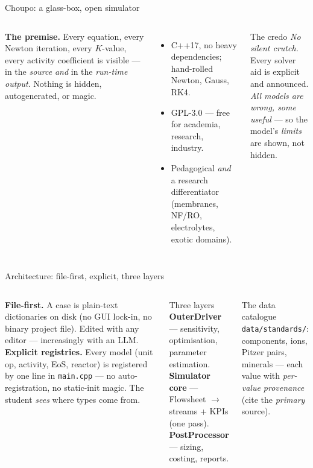 \documentclass[aspectratio=169,11pt]{beamer}
\begin{document}
\begin{frame}{Choupo: a glass-box, open simulator}
\begin{columns}
\textbf{The premise.} Every equation, every Newton iteration, every $K$-value,
every activity coefficient is visible --- in the \emph{source} \emph{and} in the
\emph{run-time output}. Nothing is hidden, autogenerated, or magic.
\vspace{0.5em}
\begin{itemize}\small
  \item C++17, no heavy dependencies; hand-rolled Newton, Gauss, RK4.
  \item GPL-3.0 --- free for academia, research, industry.
  \item Pedagogical \emph{and} a research differentiator (membranes, NF/RO,
        electrolytes, exotic domains).
\end{itemize}
\begin{block}{The credo}
\small
\emph{No silent crutch.} Every solver aid is explicit and announced. \\[0.3em]
\emph{All models are wrong, some useful} --- so the model's \emph{limits} are
shown, not hidden.
\end{block}
\end{columns}
\end{frame}

\begin{frame}{Architecture: file-first, explicit, three layers}
\begin{columns}
\textbf{File-first.} A case is plain-text dictionaries on disk (no GUI lock-in,
no binary project file). Edited with any editor --- increasingly with an LLM.
\vspace{0.4em}
\textbf{Explicit registries.} Every model (unit op, activity, EoS, reactor) is
registered by one line in \texttt{main.cpp} --- no auto-registration, no
static-init magic. The student \emph{sees} where types come from.
\begin{block}{Three layers}
\small
\textbf{OuterDriver} --- sensitivity, optimisation, parameter estimation. \\
\textbf{Simulator core} --- Flowsheet $\rightarrow$ streams + KPIs (one pass). \\
\textbf{PostProcessor} --- sizing, costing, reports.
\end{block}
\begin{block}{The data catalogue}
\small
\texttt{data/standards/}: components, ions, Pitzer pairs, minerals --- each value
with \emph{per-value provenance} (cite the \emph{primary} source).
\end{block}
\end{columns}
\end{frame}
\end{document}
